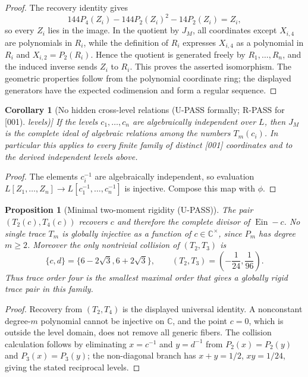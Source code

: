 \documentclass[11pt]{article}
\theoremstyle{keio}
\newtheorem{proposition}[theorem]{Proposition}
\newtheorem{corollary}[theorem]{Corollary}
\theoremstyle{definition}
\theoremstyle{remark}
\newcommand{\C}{\mathbb C}
\newcommand{\Ein}{\operatorname{Ein}}
\newcommand{\UPASS}{\textcolor{keiogreen}{\textsf{U-PASS}}}
\newcommand{\RPASS}{\textcolor{keioxblue}{\textsf{R-PASS}}}
\begin{document}
\begin{proof}
The recovery identity gives
\[
 144P_4(Z_i)-144P_2(Z_i)^2-14P_2(Z_i)=Z_i,
\]
so every \(Z_i\) lies in the image.  In the quotient by \(J_M\), all
coordinates except \(X_{i,4}\) are polynomials in \(R_i\), while the
definition of \(R_i\) expresses \(X_{i,4}\) as a polynomial in
\(R_i\) and \(X_{i,2}=P_2(R_i)\).  Hence the quotient is generated freely
by \(R_1,\ldots,R_n\), and the induced inverse sends \(Z_i\) to \(R_i\).
This proves the asserted isomorphism.  The geometric properties follow
from the polynomial coordinate ring; the displayed generators have the
expected codimension and form a regular sequence.
\end{proof}

\begin{corollary}[No hidden cross-level relations (\UPASS{} formally;
\RPASS{} for [001] levels)]
\label{cor:transfer-no-hidden-relations}
If the levels \(c_1,\ldots,c_n\) are algebraically independent over \(L\),
then \(J_M\) is the complete ideal of algebraic relations among the numbers
\(T_m(c_i)\).  In particular this applies to every finite family of
distinct [001] coordinates and to the derived independent levels above.
\end{corollary}

\begin{proof}
The elements \(c_i^{-1}\) are algebraically independent, so evaluation
\(L[Z_1,\ldots,Z_n]\to L[c_1^{-1},\ldots,c_n^{-1}]\) is injective.
Compose this map with \(\phi\).
\end{proof}

\begin{proposition}[Minimal two-moment rigidity (\UPASS)]
\label{prop:transfer-two-moment-rigidity}
The pair \((T_2(c),T_4(c))\) recovers \(c\) and therefore the complete
divisor of \(\Ein-c\).  No single trace \(T_m\) is globally injective as
a function of \(c\in\C^\times\), since \(P_m\) has degree \(m\ge2\).
Moreover the only nontrivial collision of \((T_2,T_3)\) is
\[
 \{c,d\}=\{6-2\sqrt3,6+2\sqrt3\},
 \qquad
 (T_2,T_3)=\left(-\frac1{24},\frac1{96}\right).
\]
Thus trace order four is the smallest maximal order that gives a globally
rigid trace pair in this family.
\end{proposition}

\begin{proof}
Recovery from \((T_2,T_4)\) is the displayed universal identity.  A
nonconstant degree-\(m\) polynomial cannot be injective on \(\C\), and
the point \(c=0\), which is outside the level domain, does not remove all
generic fibers.  The collision calculation follows by eliminating
\(x=c^{-1}\) and \(y=d^{-1}\) from \(P_2(x)=P_2(y)\) and
\(P_3(x)=P_3(y)\); the non-diagonal branch has
\(x+y=1/2\), \(xy=1/24\), giving the stated reciprocal levels.
\end{proof}
\end{document}
